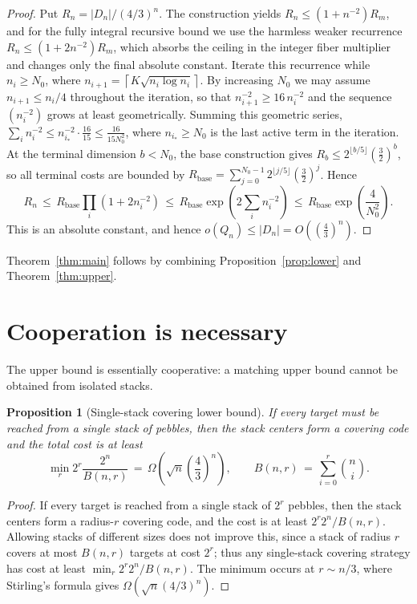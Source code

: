 \documentclass[11pt]{article}
\theoremstyle{plain}
\newtheorem{proposition}[theorem]{Proposition}
\theoremstyle{definition}
\begin{document}
\begin{proof}
Put $R_n=|D_n|/(4/3)^n$.  The construction yields $R_n\le (1+n^{-2})R_m$, and for the
fully integral recursive bound we use the harmless weaker recurrence
$R_n\le (1+2n^{-2})R_m$, which absorbs the ceiling in the integer fiber multiplier and
changes only the final absolute constant.  Iterate this recurrence while $n_i\ge N_0$,
where $n_{i+1}=\left\lceil K\sqrt{n_i\log n_i}\right\rceil$.
By increasing $N_0$ we may assume $n_{i+1}\le n_i/4$ throughout the iteration, so that
$n_{i+1}^{-2}\ge 16\,n_i^{-2}$ and the sequence $(n_i^{-2})$ grows at least geometrically.
Summing this geometric series, $\sum_i n_i^{-2}\le n_{i_*}^{-2}\cdot\frac{16}{15}\le
\frac{16}{15N_0^2}$, where $n_{i_*}\ge N_0$ is the last active term in the iteration.
At the terminal dimension $b<N_0$, the base construction gives
$R_b\le 2^{\lfloor b/5\rfloor}\left(\frac32\right)^b$, so all terminal costs are bounded by
$R_{\mathrm{base}}=\sum_{j=0}^{N_0-1}2^{\lfloor j/5\rfloor}\left(\frac32\right)^j$.  Hence
\[
R_n\,\le\, R_{\mathrm{base}}\prod_i(1+2n_i^{-2})
\,\le\, R_{\mathrm{base}}\exp\!\left(2\sum_i n_i^{-2}\right)
\,\le\, R_{\mathrm{base}}\exp\!\left(\frac{4}{N_0^2}\right).
\]
\label{lem:loss}
This is an absolute constant, and hence $o(Q_n)\le |D_n|=O\!\left(\left(\frac43\right)^n\right)$.
\end{proof}

Theorem~\ref{thm:main} follows by combining Proposition~\ref{prop:lower} and
Theorem~\ref{thm:upper}.

\section*{Cooperation is necessary}

The upper bound is essentially cooperative: a matching upper bound cannot be obtained
from isolated stacks.

\begin{proposition}[Single-stack covering lower bound]\label{prop:covering}
If every target must be reached from a single stack of pebbles, then the stack centers
form a covering code and the total cost is at least
\[
\min_r 2^r\frac{2^n}{B(n,r)}
\,=\,\Omega\!\left(\sqrt n\left(\frac43\right)^n\right),
\qquad
B(n,r)\,=\,\sum_{i=0}^r\binom ni.
\]
\end{proposition}
\begin{proof}
If every target is reached from a single stack of $2^r$ pebbles, then the stack centers
form a radius-$r$ covering code, and the cost is at least $2^r 2^n/B(n,r)$.  Allowing
stacks of different sizes does not improve this, since a stack of radius $r$ covers at most
$B(n,r)$ targets at cost $2^r$; thus any single-stack covering strategy has cost at least
$\min_r 2^r 2^n/B(n,r)$.  The minimum occurs at $r\sim n/3$, where Stirling's formula gives
$\Omega\!\left(\sqrt n(4/3)^n\right)$.
\end{proof}
\end{document}
